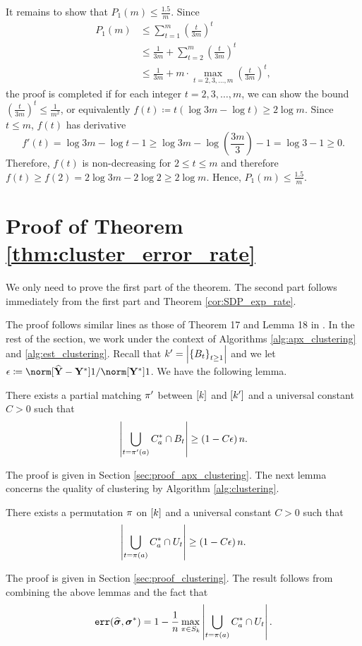 It remains to show that $P_{1}(m)\leq\frac{1.5}{m}$. Since 
\begin{align*}
P_{1}(m) & \leq\sum_{t=1}^{m}\left(\frac{t}{3m}\right)^{t}\\
 & \le\frac{1}{3m}+\sum_{t=2}^{m}\left(\frac{t}{3m}\right)^{t}\\
 & \le\frac{1}{3m}+m\cdot\max_{t=2,3,\ldots,m}\left(\frac{t}{3m}\right)^{t},
\end{align*}
the proof is completed if for each integer $t=2,3,\ldots,m$, we can
show the bound $\left(\frac{t}{3m}\right)^{t}\leq\frac{1}{m^{2}}$,
or equivalently $f(t)\coloneqq t(\log3m-\log t)\geq2\log m.$ Since
$t\le m$, $f(t)$ has derivative 
\[
f'(t)=\log3m-\log t-1\ge\log3m-\log\left(\frac{3m}{3}\right)-1=\log3-1\ge0.
\]
Therefore, $f(t)$ is non-decreasing for $2\le t\le m$ and therefore
$f(t)\ge f(2)=2\log3m-2\log2\ge2\log m.$ Hence, $P_{1}(m)\le\frac{1.5}{m}$. 

\section{Proof of Theorem \ref{thm:cluster_error_rate}\label{sec:proof_cluster_error_rate}}

We only need to prove the first part of the theorem. The second part
follows immediately from the first part and Theorem \ref{cor:SDP_exp_rate}.

The proof follows similar lines as those of Theorem 17 and Lemma 18
in \citet{makarychev2016learning}. In the rest of the section, we
work under the context of Algorithms \ref{alg:apx_clustering} and
\ref{alg:est_clustering}. Recall that $k'=\left|\left\{ B_{t}\right\} _{t\ge1}\right|$
and we let $\epsilon\coloneqq\norm[\Yhat-\Ystar]1/\norm[\Ystar]1$.
We have the following lemma.
\begin{lem}
\label{lem:apx_clustering} There exists a partial matching $\pi'$
between $\left[k\right]$ and $\left[k'\right]$ and
a universal constant $C>0$ such that 
\[
\left|\bigcup_{t=\pi'(a)}C_{a}^{*}\cap B_{t}\right|\ge\left(1-C\epsilon\right)n.
\]
\end{lem}
The proof is given in Section \ref{sec:proof_apx_clustering}. The
next lemma concerns the quality of clustering by Algorithm \ref{alg:clustering}.
\begin{lem}
\label{lem:clustering} There exists a permutation $\pi$ on $\left[k\right]$
and a universal constant $C>0$ such that 
\[
\left|\bigcup_{t=\pi(a)}C_{a}^{*}\cap U_{t}\right|\ge\left(1-C\epsilon\right)n.
\]
\end{lem}
The proof is given in Section \ref{sec:proof_clustering}. The result
follows from combining the above lemmas and the fact that 
\[
\operatorname*{\texttt{err}}(\widehat{\boldsymbol{\sigma}},\boldsymbol{\sigma}^{*})=1-\frac{1}{n}\max_{\pi\in S_{k}}\left|\bigcup_{t=\pi(a)}C_{a}^{*}\cap U_{t}\right|.
\]


